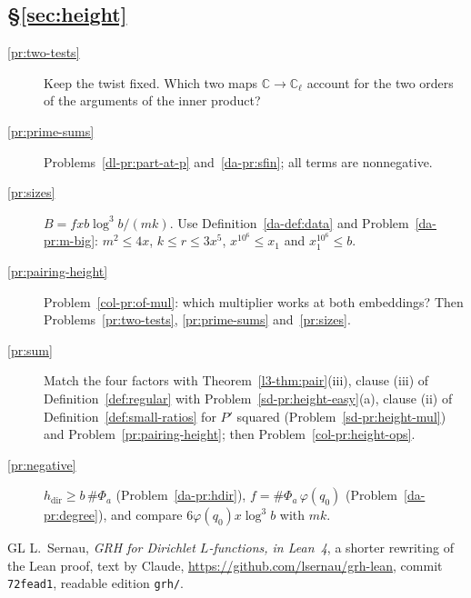 \documentclass[reqno]{amsart}
\theoremstyle{definition}
\theoremstyle{plain}
\theoremstyle{remark}
\newcommand{\C}{\mathbb{C}}
\newcommand{\hdir}{h_{\mathrm{dir}}}
\begin{document}
\subsection*{\S\ref{sec:height}}
\begin{description}
\item[\ref{pr:two-tests}] Keep the twist fixed.  Which two maps \(\C \to \C_\ell\) account for the two orders of the arguments of the inner product?
\item[\ref{pr:prime-sums}] Problems~\ref{dl-pr:part-at-p} and~\ref{da-pr:sfin}; all terms are nonnegative.
\item[\ref{pr:sizes}] \(B = fxb\log^3 b/(mk)\).  Use Definition~\ref{da-def:data} and Problem~\ref{da-pr:m-big}: \(m^2 \le 4x\), \(k \le r \le 3x^5\), \(x^{10^6} \le x_1\) and \(x_1^{10^6} \le b\).
\item[\ref{pr:pairing-height}] Problem~\ref{col-pr:of-mul}: which multiplier works at both embeddings?  Then Problems~\ref{pr:two-tests}, \ref{pr:prime-sums} and~\ref{pr:sizes}.
\item[\ref{pr:sum}] Match the four factors with Theorem~\ref{l3-thm:pair}(iii), clause (iii) of Definition~\ref{def:regular} with Problem~\ref{sd-pr:height-easy}(a), clause (ii) of Definition~\ref{def:small-ratios} for \(P'\) squared (Problem~\ref{sd-pr:height-mul}) and Problem~\ref{pr:pairing-height}; then Problem~\ref{col-pr:height-ops}.
\item[\ref{pr:negative}] \(\hdir \ge b\,\#\Phi_a\) (Problem~\ref{da-pr:hdir}), \(f = \#\Phi_a\,\varphi(q_0)\) (Problem~\ref{da-pr:degree}), and compare \(6\varphi(q_0)x\log^3 b\) with \(mk\).
\end{description}

\begin{thebibliography}{GL}
 L.~Sernau, \emph{GRH for Dirichlet \(L\)-functions, in Lean~4}, a shorter rewriting of the Lean proof, text by Claude, \url{https://github.com/lsernau/grh-lean}, commit \texttt{72fead1}, readable edition \texttt{grh/}.
\end{thebibliography}
\end{document}

